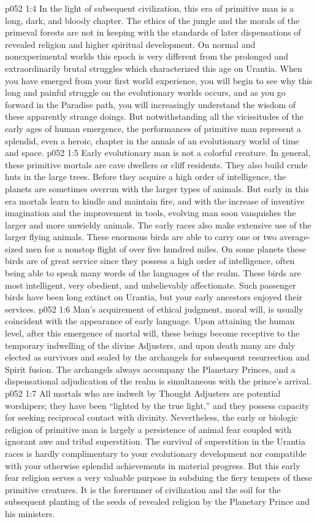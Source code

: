 \vs p052 1:4 In the light of subsequent civilization, this era of primitive man is a long, dark, and bloody chapter. The ethics of the jungle and the morals of the primeval forests are not in keeping with the standards of later dispensations of revealed religion and higher spiritual development. On normal and nonexperimental worlds this epoch is very different from the prolonged and extraordinarily brutal struggles which characterized this age on Urantia. When you have emerged from your first world experience, you will begin to see why this long and painful struggle on the evolutionary worlds occurs, and as you go forward in the Paradise path, you will increasingly understand the wisdom of these apparently strange doings. But notwithstanding all the vicissitudes of the early ages of human emergence, the performances of primitive man represent a splendid, even a heroic, chapter in the annals of an evolutionary world of time and space.
\vs p052 1:5 \pc Early evolutionary man is not a colorful creature. In general, these primitive mortals are cave dwellers or cliff residents. They also build crude huts in the large trees. Before they acquire a high order of intelligence, the planets are sometimes overrun with the larger types of animals. But early in this era mortals learn to kindle and maintain fire, and with the increase of inventive imagination and the improvement in tools, evolving man soon vanquishes the larger and more unwieldy animals. The early races also make extensive use of the larger flying animals. These enormous birds are able to carry one or two average\hyp{}sized men for a nonstop flight of over five hundred miles. On some planets these birds are of great service since they possess a high order of intelligence, often being able to speak many words of the languages of the realm. These birds are most intelligent, very obedient, and unbelievably affectionate. Such passenger birds have been long extinct on Urantia, but your early ancestors enjoyed their services.
\vs p052 1:6 \pc Man’s acquirement of ethical judgment, moral will, is usually coincident with the appearance of early language. Upon attaining the human level, after this emergence of mortal will, these beings become receptive to the temporary indwelling of the divine Adjusters, and upon death many are duly elected as survivors and sealed by the archangels for subsequent resurrection and Spirit fusion. The archangels always accompany the Planetary Princes, and a dispensational adjudication of the realm is simultaneous with the prince’s arrival.
\vs p052 1:7 All mortals who are indwelt by Thought Adjusters are potential worshipers; they have been “lighted by the true light,” and they possess capacity for seeking reciprocal contact with divinity. Nevertheless, the early or biologic religion of primitive man is largely a persistence of animal fear coupled with ignorant awe and tribal superstition. The survival of superstition in the Urantia races is hardly complimentary to your evolutionary development nor compatible with your otherwise splendid achievements in material progress. But this early fear religion serves a very valuable purpose in subduing the fiery tempers of these primitive creatures. It is the forerunner of civilization and the soil for the subsequent planting of the seeds of revealed religion by the Planetary Prince and his ministers.
